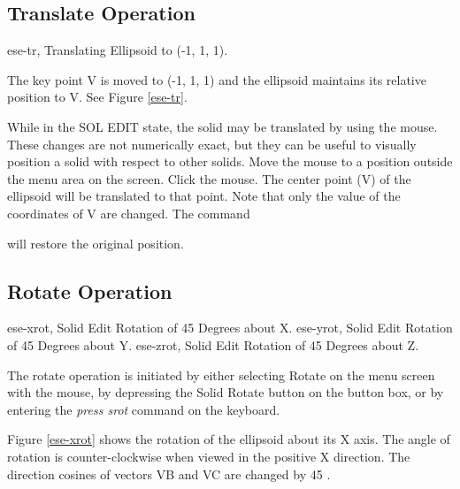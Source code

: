 \subsection{Translate Operation}
\mfig ese-tr, Translating Ellipsoid to (-1, 1, 1).


The key point V is moved to (-1, 1, 1) and the ellipsoid maintains its
relative position to V.  See Figure \ref{ese-tr}.

While in the SOL EDIT state, the solid may be translated by
using the mouse.  These changes are not numerically exact, but they can be
useful to visually position a solid with respect to other solids.
Move the mouse to a position outside the menu area on the screen.
Click the mouse.
The center point (V) of the ellipsoid will be translated to that point.
Note that only the value of the coordinates of V are changed.
The command


will restore the original position.

\subsection{Rotate Operation}
\mfig ese-xrot, Solid Edit Rotation of 45 Degrees about X.
\mfig ese-yrot, Solid Edit Rotation of 45 Degrees about Y.
\mfig ese-zrot, Solid Edit Rotation of 45 Degrees about Z.

The rotate operation is initiated by either selecting Rotate on the menu
screen with the mouse,
by depressing the Solid Rotate button on the button box,
or by entering the {\em press srot} command on the keyboard.


Figure \ref{ese-xrot} shows the rotation of the ellipsoid about its X axis.
The angle of rotation is counter-clockwise when viewed in the positive X
direction.  The direction cosines of vectors VB and VC are changed by 45 .


